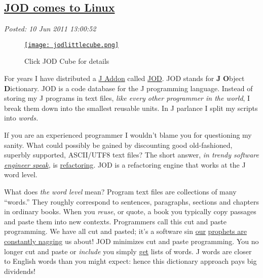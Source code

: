 %

\subsection*{\href{https://bakerjd99.wordpress.com/2011/06/10/jod-comes-to-linux/}{JOD comes to Linux}}


\noindent\emph{Posted: 10 Jun 2011 13:00:52}
\vspace{6pt}

\captionsetup[figure]{labelformat=empty}
\begin{figure}[htbp]
\centering
\href{https://analyzethedatanotthedrivel.org/the-jod-page/}{\texttt{[image: jodlittlecube.png]}}
\caption{Click JOD Cube for details}
\label{fig:jodlittlecube}
\end{figure}

For years I have distributed a
\href{http://www.jsoftware.com/jwiki/Addons}{J Addon} called
\href{http://bakerjd99.wordpress.com/the-jod-page/}{JOD}. JOD stands for
\textbf{J} \textbf{O}bject \textbf{D}ictionary. JOD is a code database
for the J programming language. Instead of storing my J programs in text
files, \emph{like every other programmer in the world}, I break them
down into the smallest reusable units. In J parlance I split my scripts
into \emph{words.}

If you are an experienced programmer I wouldn't blame you for
questioning my sanity. What could possibly be gained by discounting good
old-fashioned, superbly supported, ASCII/UTF8 text files? The short
answer, \emph{in trendy software
\href{http://ee.cleversoul.com/fun/engspeak.html}{engineer speak},} is
\href{http://c2.com/cgi/wiki?WhatIsRefactoring}{refactoring}. JOD is a
refactoring engine that works at the J word level.

What does \emph{the word level} mean? Program text files are collections
of many ``words.'' They roughly correspond to sentences, paragraphs,
sections and chapters in ordinary books. When you \emph{reuse}, or
quote, a book you typically copy passages and paste them into new
contexts. Programmers call this cut and paste programming. We have all
cut and pasted; it's a software sin
\href{http://c2.com/cgi/wiki?CopyAndPasteProgramming}{our} \href{http://c2.com/cgi/wiki?CopyAndPasteProgramming}{prophets
are constantly nagging} us about! JOD minimizes cut and paste
programming. You no longer cut and paste or \emph{include} you simply
\href{https://docs.google.com/document/d/1Vk-PQrdPEISp0SL4eDaGDgg5HpATarPPvXHryC12I8M/edit?hl=en\_US\&pli=1\#}{get}
lists of words. J words are closer to English words than you might
expect: hence this dictionary approach pays big dividends!

